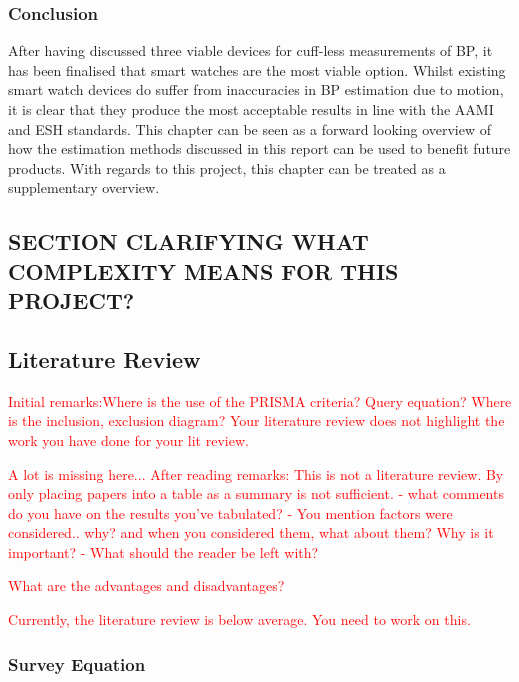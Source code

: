 \subsubsection{Conclusion}
After having discussed three viable devices for cuff-less measurements of BP, it has been finalised that smart 
watches are the most viable option. Whilst existing smart watch devices do suffer from inaccuracies in BP estimation
 due to motion, it is clear that they produce the most acceptable results in line with the AAMI and ESH standards. This 
 chapter can be seen as a forward looking overview of how the estimation methods discussed in this report can be used to
  benefit future products. With regards to this project, this chapter can be treated as a supplementary overview.





\subsection{SECTION CLARIFYING WHAT COMPLEXITY MEANS FOR THIS PROJECT?}

 \subsection{Literature Review}

\textcolor{red}{Initial remarks:Where is the use of the PRISMA criteria? Query equation? Where is the inclusion, exclusion diagram? Your literature review does not highlight the work you have done for your lit review.}

\textcolor{red}{A lot is missing here...}
\textcolor{red}{After reading remarks:}
\textcolor{red}{This is not a literature review. By only placing papers into a table as a summary is not sufficient.}
\textcolor{red}{- what comments do you have on the results you've tabulated?}
\textcolor{red}{- You mention factors were considered.. why? and when you considered them, what about them? Why is it important?}
\textcolor{red}{- What should the reader be left with?}

\textcolor{red}{What are the advantages and disadvantages?}

\textcolor{red}{Currently, the literature review is below average. You need to work on this.}


\subsubsection{Survey Equation}

